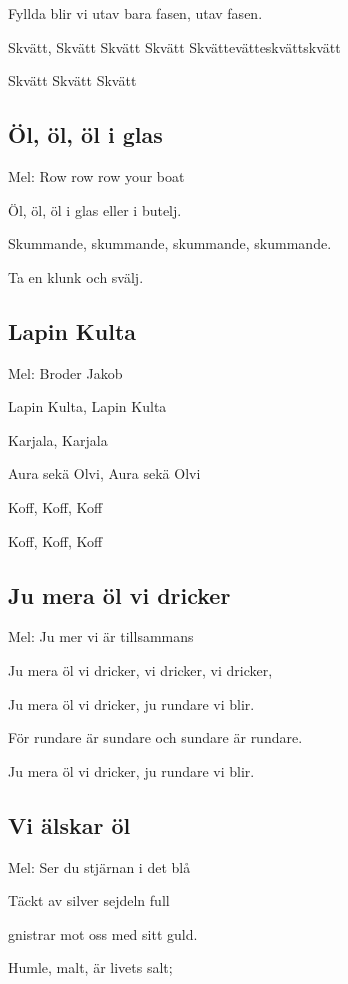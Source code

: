 Fyllda blir vi utav bara fasen, utav fasen.

Skvätt, Skvätt Skvätt Skvätt Skvättevätteskvättskvätt

Skvätt Skvätt Skvätt

\subsection{\textbf{Öl, öl, öl i glas}}

Mel: Row row row your boat\bigskip

Öl, öl, öl i glas eller i butelj.

Skummande, skummande, skummande, skummande.

Ta en klunk och svälj. 

\subsection{\textbf{Lapin Kulta}}

Mel: Broder Jakob\bigskip


Lapin Kulta, Lapin Kulta

Karjala, Karjala

Aura sekä Olvi, Aura sekä Olvi

Koff, Koff, Koff

Koff, Koff, Koff

\subsection{\textbf{Ju mera öl vi dricker}} 

Mel: Ju mer vi är tillsammans \bigskip


Ju mera öl vi dricker, vi dricker, vi dricker,

Ju mera öl vi dricker, ju rundare vi blir.

För rundare är sundare och sundare är rundare.

Ju mera öl vi dricker, ju rundare vi blir.

\subsection{\textbf{Vi älskar öl}}

Mel: Ser du stjärnan i det blå\bigskip


Täckt av silver sejdeln full

gnistrar mot oss med sitt guld.

Humle, malt, är livets salt;

